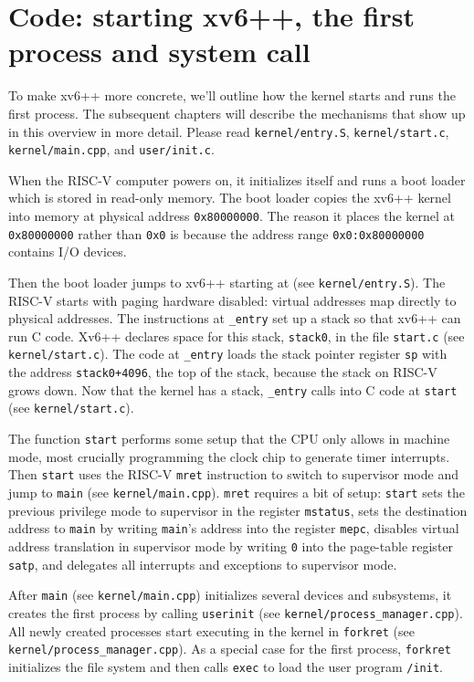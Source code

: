 \section{Code: starting xv6++, the first process and system call}
To make xv6++ more concrete, we'll outline how the kernel starts and
runs the first process. The subsequent chapters will describe the
mechanisms that show up in this overview in more detail.
Please read \texttt{kernel/entry.S}, \texttt{kernel/start.c},
\texttt{kernel/main.cpp}, and \texttt{user/init.c}.

When the RISC-V computer powers on, it initializes
itself and runs a boot loader which is stored in read-only
memory.  The boot loader copies the xv6++ kernel into memory
at physical address
\texttt{0x80000000}.
The reason it places the kernel at
\texttt{0x80000000}
rather than
\texttt{0x0}
is because the address range
\texttt{0x0:0x80000000}
contains I/O devices.

Then the boot loader jumps to xv6++ starting at
(see \texttt{kernel/entry.S}).
The RISC-V starts with paging hardware disabled:
virtual addresses map directly to physical addresses.
The instructions at
\lstinline{_entry}
set up a stack so that xv6++ can run C code.
Xv6++ declares space for this stack,
\lstinline{stack0},
in the file
\lstinline{start.c}
(see \texttt{kernel/start.c}).
The code at
\lstinline{_entry}
loads the stack pointer register
\texttt{sp}
with the address
\lstinline{stack0+4096},
the top of the stack, because the stack
on RISC-V grows down.
Now that the kernel has a stack,
\lstinline{_entry}
calls into C code at
\lstinline{start}
(see \texttt{kernel/start.c}).

The function
\lstinline{start}
performs some setup that the CPU only allows in machine mode,
most crucially programming the clock chip to generate
timer interrupts.
Then {\tt start} uses the RISC-V {\tt mret}
instruction to switch to supervisor mode and
jump to
\lstinline{main}
(see \texttt{kernel/main.cpp}).
{\tt mret} requires
a bit of setup:
{\tt start} sets the previous privilege mode to
supervisor in the register
\lstinline{mstatus},
sets the destination address to
\lstinline{main}
by writing
\lstinline{main}'s
address into
the register
\lstinline{mepc},
disables virtual address translation in supervisor mode
by writing
\lstinline{0}
into the page-table register
\lstinline{satp},
and delegates all interrupts and exceptions
to supervisor mode.

After
\lstinline{main}
(see \texttt{kernel/main.cpp})
initializes several devices and subsystems,
it creates the first process by calling
\lstinline{userinit}
(see \texttt{kernel/process\_manager.cpp}).
All newly created processes start executing in the kernel in
\lstinline{forkret}
(see \texttt{kernel/process\_manager.cpp}).
As a special case for the first process, {\tt forkret}
initializes the file system and then calls {\tt exec}
to load the user program {\tt /init}.

